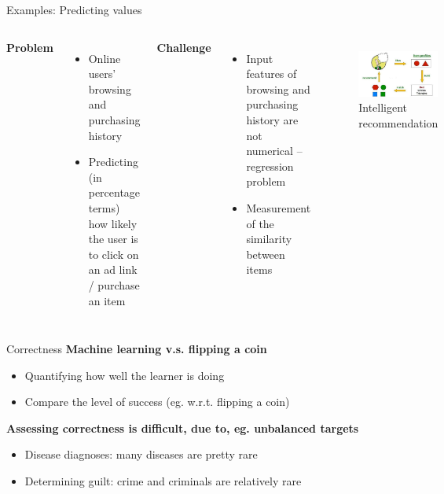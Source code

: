 \documentclass{beamer}
\begin{document}
\begin{frame}{Examples: Predicting values}
\begin{columns}
\textbf{Problem}
\begin{itemize}
\item Online users' browsing and purchasing history
\item Predicting (in percentage terms) how likely the user is to click on an ad link / purchase an item
\end{itemize}
\vspace{6pt}
\textbf{Challenge}
\begin{itemize}
\item Input features of browsing and purchasing history are not numerical -- regression problem
\item Measurement of the similarity between items
\end{itemize}
\begin{figure}
\centering
\includegraphics[width=3cm]{ep8.png}
{\tiny Intelligent recommendation}
\end{figure}
\end{columns}
\end{frame}

\begin{frame}{Correctness}
\textbf{Machine learning v.s. flipping a coin}
\begin{itemize}
\item Quantifying how well the learner is doing
\item Compare the level of success (eg. w.r.t. flipping a coin)
\end{itemize}
\vspace{6pt}
\textbf{Assessing correctness is difficult, due to, eg. unbalanced targets}
\begin{itemize}
\item Disease diagnoses: many diseases are pretty rare
\item Determining guilt: crime and criminals are relatively rare
\end{itemize}
\end{frame}
\end{document}
